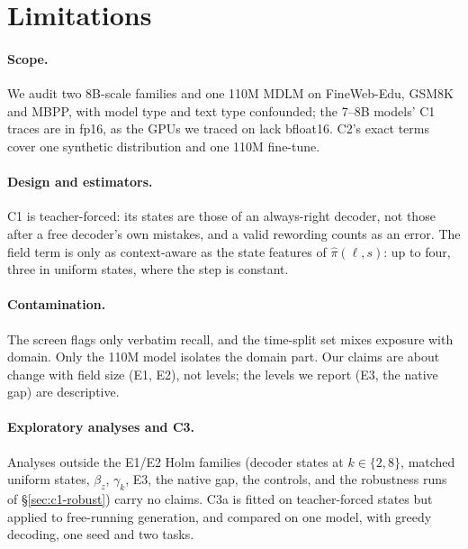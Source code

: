 
\section*{Limitations}

\paragraph{Scope.}
We audit two 8B-scale families and one 110M MDLM on FineWeb-Edu, GSM8K and MBPP, with model
type and text type confounded; the 7--8B models' C1 traces are in fp16, as the GPUs we traced on lack bfloat16. C2's
exact terms cover one synthetic distribution and one 110M fine-tune.

\paragraph{Design and estimators.}
C1 is teacher-forced: its states are those of an always-right decoder, not those after a free
decoder's own mistakes, and a valid rewording counts as an error. The field term is only as
context-aware as the state features of $\hat\pi(\ell,s)$: up to four, three in uniform states,
where the step is constant.

\paragraph{Contamination.}
The screen flags only verbatim recall, and the time-split set mixes exposure with domain. Only
the 110M model isolates the domain part. Our claims are about change with field size (E1, E2),
not levels; the levels we report (E3, the native gap) are descriptive.

\paragraph{Exploratory analyses and C3.}
Analyses outside the E1/E2 Holm families (decoder states at $k\in\{2,8\}$, matched uniform states,
$\beta_z$, $\gamma_k$, E3, the native gap, the controls, and the robustness runs of \S\ref{sec:c1-robust}) carry no claims. C3a is fitted on
teacher-forced states but applied to free-running generation, and compared on one model, with
greedy decoding, one seed and two tasks.
